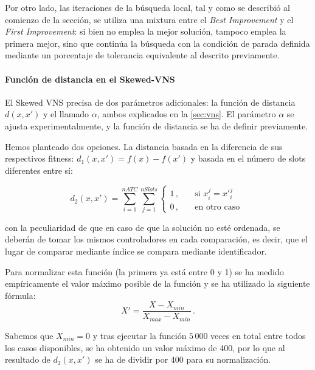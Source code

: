 Por otro lado, las iteraciones de la búsqueda local, tal y como se describió al comienzo de la sección, se utiliza una mixtura entre el \textit{Best Improvement} y el \textit{First Improvement}: si bien no emplea la mejor solución, tampoco emplea la primera mejor, sino que continúa la búsqueda con la condición de parada definida mediante un porcentaje de tolerancia equivalente al descrito previamente.

\paragraph{Función de distancia en el Skewed-VNS}
El Skewed VNS precisa de dos parámetros adicionales: la función de distancia $d(x,x')$ y el llamado $\alpha$, ambos explicados en la \autoref{sec:vns}. El parámetro $\alpha$ se ajusta experimentalmente, y la función de distancia se ha de definir previamente.

\begin{minipage}{\textwidth}
Hemos planteado dos opciones. La distancia basada en la diferencia de sus respectivos fitness: $d_1(x,x')=f(x)-f(x')$ y basada en el número de slots diferentes entre sí:

\[
d_2(x,x')=\sum_{i=1}^{nATC} \sum_{j=1}^{nSlots}
\begin{cases}
    1\,, & \quad \textrm{si } x_i^j = {x'}_i^j \\
    0\,, & \quad \textrm{en otro caso }
\end{cases}
\]

\end{minipage}

con la peculiaridad de que en caso de que la solución no esté ordenada, se deberán de tomar los mismos controladores en cada comparación, es decir, que el lugar de comparar mediante índice se compara mediante identificador.

Para normalizar esta función (la primera ya está entre 0 y 1) se ha medido empíricamente el valor máximo posible de la función
y se ha utilizado la siguiente fórmula:
\[
    X' = \frac{X-X_{min}}{X_{max}-X_{min}} \,.
\]

Sabemos que $X_{min}=0$ y tras ejecutar la función $5\,000$ veces en total entre todos los casos disponibles, se ha obtenido un valor máximo de 400, por lo que al resultado de $d_2(x,x')$ se ha de dividir por 400 para su normalización.
